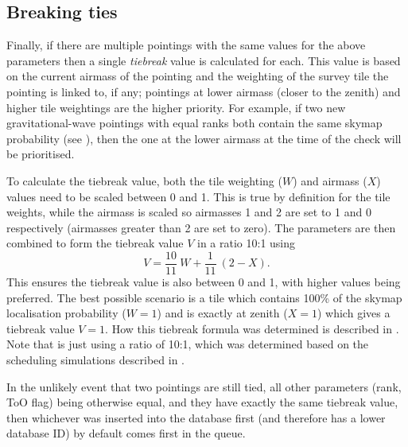 \subsection{Breaking ties}
\label{sec:breaking_ties}
\begin{colsection}

Finally, if there are multiple pointings with the same values for the above parameters then a single \emph{tiebreak} value is calculated for each. This value is based on the current airmass of the pointing and the weighting of the survey tile the pointing is linked to, if any; pointings at lower airmass (closer to the zenith) and higher tile weightings are the higher priority. For example, if two new gravitational-wave pointings with equal ranks both contain the same skymap probability (see ), then the one at the lower airmass at the time of the check will be prioritised.

\newpage

To calculate the tiebreak value, both the tile weighting ($W$) and airmass ($X$) values need to be scaled between 0 and 1. This is true by definition for the tile weights, while the airmass is scaled so airmasses 1 and 2 are set to 1 and 0 respectively (airmasses greater than 2 are set to zero). The parameters are then combined to form the tiebreak value $V$ in a ratio 10:1 using
%
\begin{equation}
    V = \frac{10}{11}~W + \frac{1}{11}~(2 - X).
    \label{eq:tiebreak}
\end{equation}
%
This ensures the tiebreak value is also between 0 and 1, with higher values being preferred. The best possible scenario is a tile which contains 100\% of the skymap localisation probability ($W=1$) and is exactly at zenith ($X=1$) which gives a tiebreak value $V=1$. How this tiebreak formula was determined is described in . Note that  is just  using a ratio of 10:1, which was determined based on the scheduling simulations described in .

In the unlikely event that two pointings are still tied, all other parameters (rank, ToO flag) being otherwise equal, and they have exactly the same tiebreak value, then whichever was inserted into the database first (and therefore has a lower database ID) by default comes first in the queue.

\end{colsection}


